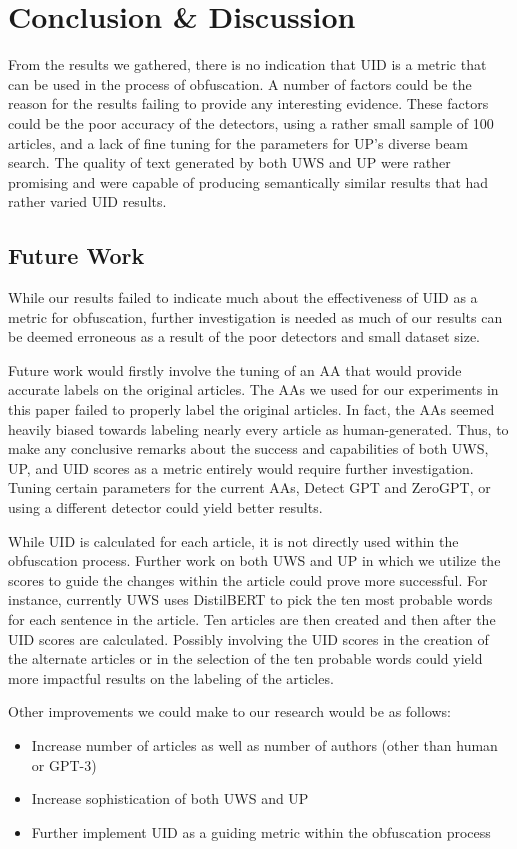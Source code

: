 \documentclass{article}
\begin{document}
\section{Conclusion \& Discussion}
From the results we gathered, there is no indication that UID is a metric that can be used in the process of obfuscation. A number of factors could be the reason for the results failing to provide any interesting evidence. These factors could be the poor accuracy of the detectors, using a rather small sample of 100 articles, and a lack of fine tuning for the parameters for UP's diverse beam search. The quality of text generated by both UWS and UP were rather promising and were capable of producing semantically similar results that had rather varied UID results.
\subsection{Future Work}
While our results failed to indicate much about the effectiveness of UID as a metric for obfuscation, further investigation is needed as much of our results can be deemed erroneous as a result of the poor detectors and small dataset size.

Future work would firstly involve the tuning of an AA that would provide accurate labels on the original articles. The AAs we used for our experiments in this paper failed to properly label the original articles. In fact, the AAs seemed heavily biased towards labeling nearly every article as human-generated. Thus, to make any conclusive remarks about the success and capabilities of both UWS, UP, and UID scores as a metric entirely would require further investigation. Tuning certain parameters for the current AAs, Detect GPT and ZeroGPT, or using a different detector could yield better results.

While UID is calculated for each article, it is not directly used within the obfuscation process. Further work on both UWS and UP in which we utilize the scores to guide the changes within the article could prove more successful. For instance, currently UWS uses DistilBERT to pick the ten most probable words for each sentence in the article. Ten articles are then created and then after the UID scores are calculated. Possibly involving the UID scores in the creation of the alternate articles or in the selection of the ten probable words could yield more impactful results on the labeling of the articles.

Other improvements we could make to our research would be as follows:
\begin{itemize}
    \item Increase number of articles as well as number of authors (other than human or GPT-3)
    \item Increase sophistication of both UWS and UP
    \item Further implement UID as a guiding metric within the obfuscation process
\end{itemize}
\end{document}

